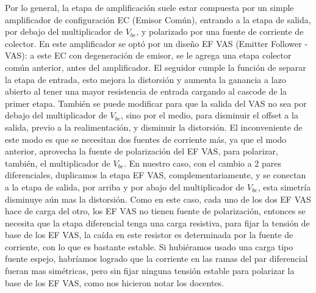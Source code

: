 Por lo general, la etapa de amplificación suele estar compuesta por un simple amplificador de configuración EC (Emisor Común), entrando a la etapa de salida, por debajo del multiplicador de $V_{be}$, y polarizado por una fuente de corriente de colector. En este amplificador se optó por un diseño EF VAS (Emitter Follower - VAS): a este EC con degeneración de emisor, se le agrega una etapa colector común anterior, antes del amplificador. El seguidor cumple la función de  separar la etapa de entrada, esto mejora la distorsión y aumenta la ganancia a lazo abierto al tener una mayor resistencia de entrada cargando al cascode de la primer etapa. También se puede modificar para que la salida del VAS no sea por debajo del multiplicador de $V_{be}$, sino por el medio, para disminuir el offset a la salida, previo a la realimentación, y disminuir la distorsión. El inconveniente de este modo es que se necesitan dos fuentes de corriente más, ya que el modo anterior, aprovecha la fuente de polarización del EF VAS, para polarizar, también, el multiplicador de $V_{be}$. En nuestro caso, con el cambio a 2 pares diferenciales, duplicamos la etapa EF VAS, complementariamente, y se conectan a la etapa de salida, por arriba y por abajo del multiplicador de $V_{be}$, esta simetría disminuye aún mas la distorsión. Como en este caso, cada uno de los dos EF VAS hace de carga del otro, los EF VAS no tienen fuente de polarización, entonces se necesita que la etapa diferencial tenga una carga resistiva, para fijar la tensión de base de los EF VAS, la caída en este resistor es determinada por la fuente de corriente, con lo que es bastante estable. Si hubiéramos usado una carga tipo fuente espejo, habríamos logrado que la corriente en las ramas del par diferencial fueran mas simétricas, pero sin fijar ninguna tensión estable para polarizar la base de los EF VAS, como nos hicieron notar los docentes.

